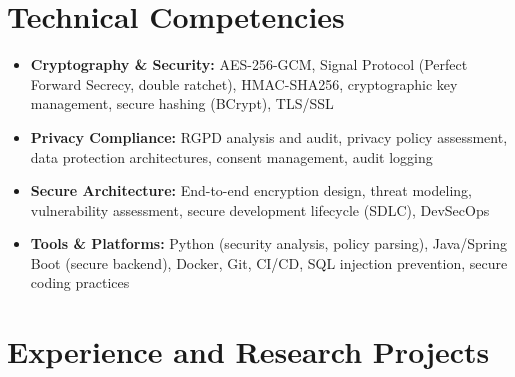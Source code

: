 \documentclass[a4paper,11pt]{article}
\begin{document}
\vspace{4pt}

\section{Technical Competencies}
\begin{itemize}[leftmargin=*, nosep]
    \item \small{\textbf{Cryptography \& Security:} AES-256-GCM, Signal Protocol (Perfect Forward Secrecy, double ratchet), HMAC-SHA256, cryptographic key management, secure hashing (BCrypt), TLS/SSL}
    \item \small{\textbf{Privacy Compliance:} RGPD analysis and audit, privacy policy assessment, data protection architectures, consent management, audit logging}
    \item \small{\textbf{Secure Architecture:} End-to-end encryption design, threat modeling, vulnerability assessment, secure development lifecycle (SDLC), DevSecOps}
    \item \small{\textbf{Tools \& Platforms:} Python (security analysis, policy parsing), Java/Spring Boot (secure backend), Docker, Git, CI/CD, SQL injection prevention, secure coding practices}
\end{itemize}

\vspace{4pt}

\section{Experience and Research Projects}
\end{document}

